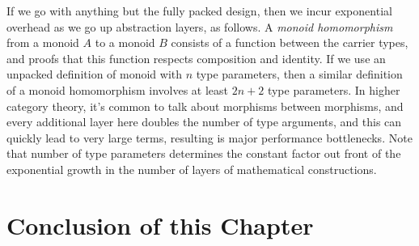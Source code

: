 If we go with anything but the fully packed design, then we incur exponential overhead as we go up abstraction layers, as follows.
A \emph{monoid homomorphism} from a monoid $A$ to a monoid $B$ consists of a function between the carrier types, and proofs that this function respects composition and identity.
If we use an unpacked definition of monoid with $n$ type parameters, then a similar definition of a monoid homomorphism involves at least $2n+2$ type parameters.
In higher category theory, it's common to talk about morphisms between morphisms, and every additional layer here doubles the number of type arguments, and this can quickly lead to very large terms, resulting is major performance bottlenecks.
Note that number of type parameters determines the constant factor out front of the exponential growth in the number of layers of mathematical constructions.


\section{Conclusion of this Chapter}

